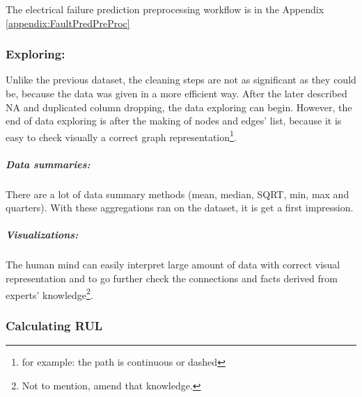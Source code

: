 		The electrical failure prediction preprocessing workflow is in the Appendix \ref{appendix:FaultPredPreProc}
		\subsubsection{Exploring:}
			Unlike the previous dataset, the cleaning steps are not as significant as they could be, because the data was given in a more efficient way. After the later described NA and duplicated column dropping, the data exploring can begin. However, the end of data exploring is after the making of nodes and edges' list, because it is easy to check visually a correct graph representation\footnote{for example: the path is continuous or dashed}.
			\subparagraph{Data summaries:}
			There are a lot of data summary methods (mean, median, SQRT, min, max and quarters). With these aggregations ran on the dataset, it is get a first impression. 
			\subparagraph{Visualizations:}
			The human mind can easily interpret large amount of data with correct visual representation and to go further check the connections and facts derived from experts' knowledge\footnote{Not to mention, amend that knowledge.}.
		\subsubsection{Calculating RUL}

